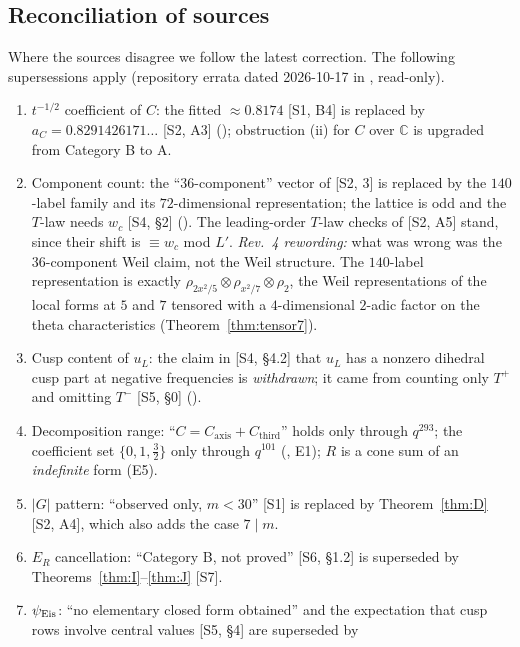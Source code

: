 \documentclass[11pt]{article}
\theoremstyle{definition}
\newcommand{\C}{\mathbb{C}}
\newcommand{\Cthird}{C_{\mathrm{third}}}
\newcommand{\Caxis}{C_{\mathrm{axis}}}
\newcommand{\src}[1]{\textup{[S#1]}}
\begin{document}
\subsection{Reconciliation of sources}\label{sec:recon}
Where the sources disagree we follow the latest correction. The following supersessions apply (repository errata dated 2026-10-17 in
, read-only).
\begin{enumerate}[leftmargin=2em]
\item $t^{-1/2}$ coefficient of $C$: the fitted $\approx0.8174$ \src{1, B4} is replaced by $a_C=0.8291426171\ldots$ \src{2, A3}
(); obstruction (ii) for $C$ over $\C$ is upgraded from Category B to A.
\item Component count: the ``36-component'' vector of \src{2, 3} is replaced by the $140$-label family and its $72$-dimensional representation; the
lattice is odd and the $T$-law needs $w_c$ \src{4, \S2} (). The leading-order $T$-law checks of \src{2, A5} stand,
since their shift is $\equiv w_c$ mod $L'$. \emph{Rev.~4 rewording:} what was wrong was the $36$-component Weil claim, not the Weil structure. The
$140$-label representation is exactly $\rho_{2x^2/5}\otimes\rho_{x^2/7}\otimes\rho_2$, the Weil representations of the local forms at $5$ and $7$ tensored with a
$4$-dimensional $2$-adic factor on the theta characteristics (Theorem~\ref{thm:tensor7}).
\item Cusp content of $u_L$: the claim in \src{4, \S4.2} that $u_L$ has a nonzero dihedral cusp part at negative frequencies is \emph{withdrawn};
it came from counting only $T^+$ and omitting $T^-$ \src{5, \S0} ().
\item Decomposition range: ``$C=\Caxis+\Cthird$'' holds only through $q^{293}$; the coefficient set $\{0,1,\tfrac32\}$ only through $q^{101}$
(, E1); $R$ is a cone sum of an \emph{indefinite} form (E5).
\item $|G|$ pattern: ``observed only, $m<30$'' \src{1} is replaced by Theorem~\ref{thm:D} \src{2, A4}, which also adds the case $7\mid m$.
\item $E_R$ cancellation: ``Category B, not proved'' \src{6, \S1.2} is superseded by Theorems~\ref{thm:I}--\ref{thm:J} \src{7}.
\item $\psi_{\rm Eis}$: ``no elementary closed form obtained'' and the expectation that cusp rows involve central values \src{5, \S4} are superseded by

\end{enumerate}
\end{document}
